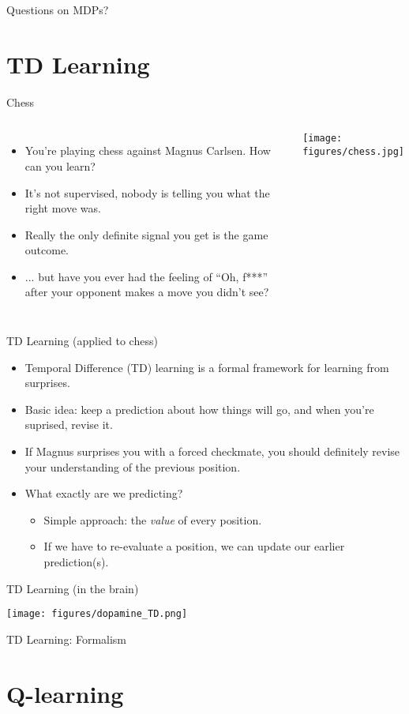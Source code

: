 \documentclass{beamer}
\begin{document}
\begin{frame}[standout]
Questions on MDPs?
\end{frame}

\section{TD Learning}
\begin{frame}{Chess}
\begin{columns}
\begin{itemize}
    \item<1-> You're playing chess against Magnus Carlsen. How can you learn?
    \item<2-> It's not supervised, nobody is telling you what the right move was.
    \item<3-> Really the only definite signal you get is the game outcome.
    \item<4-> ... but have you ever had the feeling of ``Oh, f***'' after your opponent makes a move you didn't see?
\end{itemize}
    \begin{center}
    \texttt{[image: figures/chess.jpg]}
    \end{center}
\end{columns}
\end{frame}

\begin{frame}{TD Learning (applied to chess)}
\begin{itemize}
    \item<1-> Temporal Difference (TD) learning is a formal framework for learning from surprises. 
    \item<2-> Basic idea: keep a prediction about how things will go, and when you're suprised, revise it. 
    \item<3-> If Magnus surprises you with a forced checkmate, you should definitely revise your understanding of the previous position.
    \item<4-> What exactly are we predicting? 
    \begin{itemize}
        \item<5-> Simple approach: the \emph{value} of every position.
        \item<6-> If we have to re-evaluate a position, we can update our earlier prediction(s).
    \end{itemize}
\end{itemize}
\end{frame}

\begin{frame}{TD Learning (in the brain)}

\begin{center}
\texttt{[image: figures/dopamine\_TD.png]}
\end{center}
\end{frame}

\begin{frame}{TD Learning: Formalism}
\end{frame}

\section{Q-learning}
\end{document}
